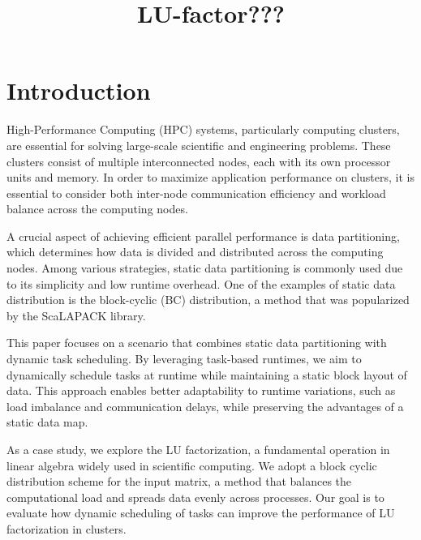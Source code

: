 \documentclass[conference, 10pt, final]{IEEEtran}
\date{}
\title{LU-factor}
\begin{document}
\title{???}

\author{
}

\maketitle

\newcommand{\kiter}{K Iteration}
\begin{abstract}
\end{abstract}
\section{Introduction}
\label{sec:orgec14744}
High-Performance Computing (HPC) systems, particularly computing clusters, are essential for solving large-scale scientific and engineering problems. These clusters consist of multiple interconnected nodes, each with its own processor units and memory. In order to maximize application performance on clusters, it is essential to consider both inter-node communication efficiency and workload balance across the computing nodes.

A crucial aspect of achieving efficient parallel performance is data partitioning, which determines how data is divided and distributed across the computing nodes. Among various strategies, static data partitioning is commonly used due to its simplicity and low runtime overhead. One of the examples of static data distribution is the block-cyclic (BC) distribution, a method that was popularized by the ScaLAPACK \cite{blackford1997scalapack} library.

This paper focuses on a scenario that combines static data partitioning with dynamic task scheduling. By leveraging task-based runtimes, we aim to dynamically schedule tasks at runtime while maintaining a static block layout of data. This approach enables better adaptability to runtime variations, such as load imbalance and communication delays, while preserving the advantages of a static data map.

As a case study, we explore the LU factorization, a fundamental operation in linear algebra widely used in scientific computing. We adopt a block cyclic distribution scheme for the input matrix, a method that balances the computational load and spreads data evenly across processes. Our goal is to evaluate how dynamic scheduling of tasks can improve the performance of LU factorization in clusters.
\end{document}
